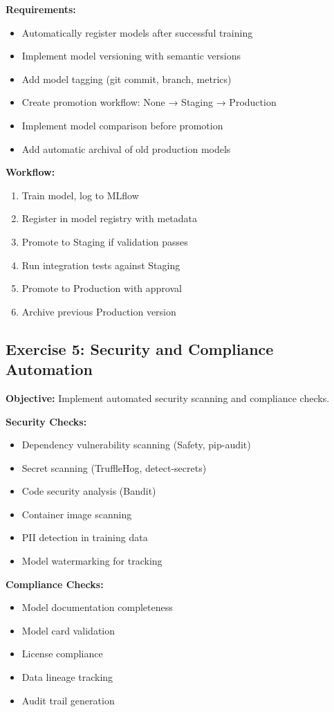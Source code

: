 \textbf{Requirements:}
\begin{itemize}
    \item Automatically register models after successful training
    \item Implement model versioning with semantic versions
    \item Add model tagging (git commit, branch, metrics)
    \item Create promotion workflow: None → Staging → Production
    \item Implement model comparison before promotion
    \item Add automatic archival of old production models
\end{itemize}

\textbf{Workflow:}
\begin{enumerate}
    \item Train model, log to MLflow
    \item Register in model registry with metadata
    \item Promote to Staging if validation passes
    \item Run integration tests against Staging
    \item Promote to Production with approval
    \item Archive previous Production version
\end{enumerate}

\subsection{Exercise 5: Security and Compliance Automation}

\textbf{Objective:} Implement automated security scanning and compliance checks.

\textbf{Security Checks:}
\begin{itemize}
    \item Dependency vulnerability scanning (Safety, pip-audit)
    \item Secret scanning (TruffleHog, detect-secrets)
    \item Code security analysis (Bandit)
    \item Container image scanning
    \item PII detection in training data
    \item Model watermarking for tracking
\end{itemize}

\textbf{Compliance Checks:}
\begin{itemize}
    \item Model documentation completeness
    \item Model card validation
    \item License compliance
    \item Data lineage tracking
    \item Audit trail generation
\end{itemize}

